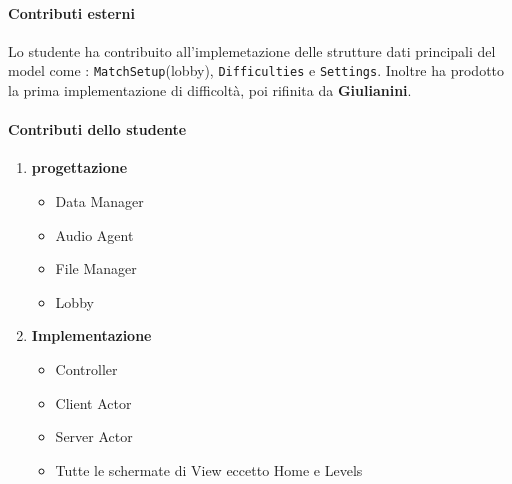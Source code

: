     \paragraph{Contributi esterni}
        Lo studente ha contribuito all'implemetazione delle strutture dati principali del model come : \texttt{MatchSetup}(lobby), \texttt{Difficulties} e \texttt{Settings}.
        Inoltre ha prodotto la prima implementazione di difficoltà, poi rifinita da \textbf{Giulianini}.
        
\paragraph{Contributi dello studente}
\begin{enumerate}
    \item \textbf{progettazione}
        \begin{itemize}
	        \item Data Manager
	        \item Audio Agent
	        \item File Manager
        	\item Lobby
        \end{itemize}
    \item \textbf{Implementazione}
        \begin{itemize}
            \item Controller
	        \item Client Actor
	        \item Server Actor
            \item Tutte le schermate di View eccetto Home e Levels
        \end{itemize}
\end{enumerate}


